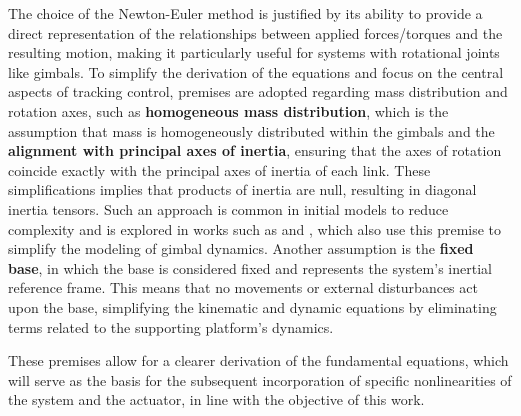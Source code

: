 The choice of the Newton-Euler method is justified by its ability to provide a direct representation of the relationships between applied forces/torques and the resulting motion, making it particularly useful for systems with rotational joints like gimbals. To simplify the derivation of the equations and focus on the central aspects of tracking control, premises are adopted regarding mass distribution and rotation axes, such as \textbf{homogeneous mass distribution}, which is the assumption that mass is homogeneously distributed within the gimbals and the \textbf{alignment with principal axes of inertia}, ensuring that the axes of rotation coincide exactly with the principal axes of inertia of each link. These simplifications implies that products of inertia are null, resulting in diagonal inertia tensors. Such an approach is common in initial models to reduce complexity and is explored in works such as  and , which also use this premise to simplify the modeling of gimbal dynamics. Another assumption is the \textbf{fixed base}, in which the base is considered fixed and represents the system's inertial reference frame. This means that no movements or external disturbances act upon the base, simplifying the kinematic and dynamic equations by eliminating terms related to the supporting platform's dynamics.

These premises allow for a clearer derivation of the fundamental equations, which will serve as the basis for the subsequent incorporation of specific nonlinearities of the system and the actuator, in line with the objective of this work.

